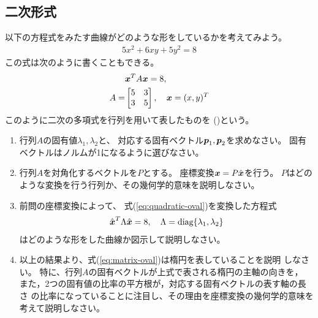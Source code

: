 \documentclass[twocolumn,11pt]{jarticle}
\begin{document}
\subsection{二次形式\label{sec:rotate}}
\question
以下の方程式をみたす曲線がどのような形をしているかを考えてみよう。
\begin{align}
  \label{eq:matrix-oval}
  5x^2 + 6 xy + 5y^2=8
\end{align}
この式は次のように書くこともできる。
\begin{align}
  \label{eq:quadratic-oval}
  &\boldsymbol{x}^TA\boldsymbol{x}=8,\\
  A=&
  \begin{bmatrix}
    5 & 3 \\
    3 & 5 
  \end{bmatrix},\quad
  \boldsymbol{x}={(x,y)^T}
  \notag
\end{align}
このように二次の多項式を行列を用いて表したものを
()という。
\begin{enumerate}
\item 行列$A$の固有値$\lambda_1,\lambda_2$と、
  対応する固有ベクトル$\boldsymbol{p}_1,\boldsymbol{p}_2$を求めなさい。
  固有ベクトルはノルムが1になるように選びなさい。
\item 行列$A$を対角化するベクトルを$P$とする。
  座標変換$\boldsymbol{x}=P\hat{\boldsymbol{x}}$を行う。
  $P$はどのような変換を行う行列か、その幾何学的意味を説明しなさい。
\item 前問の座標変換によって、
  式(\ref{eq:quadratic-oval})を変換した方程式
  \begin{align}
    \hat{\boldsymbol{x}}^T\Lambda\hat{\boldsymbol{x}}=8,\quad 
    \Lambda=\mbox{diag}\{\lambda_1,\lambda_2\}
  \end{align}
  はどのような形をした曲線か図示して説明しなさい。
\item 
  以上の結果より、式(\ref{eq:matrix-oval})は楕円を表していることを説明
  しなさい。
  特に、行列$A$の固有ベクトルが上式で表される楕円の主軸の向きを，
  また，2つの固有値の比率の平方根が，対応する固有ベクトルの表す軸の長さ
  の比率になっていることに注目し、その理由を座標変換の幾何学的意味を
  考えて説明しなさい。
\end{enumerate}
\end{document}
